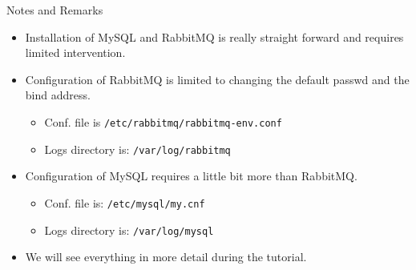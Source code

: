 \documentclass[english,serif,mathserif]{beamer}
\begin{document}
\begin{frame}{Notes and Remarks}

\begin{itemize}
\item Installation of MySQL and RabbitMQ is really straight forward
and requires limited intervention. 
\item Configuration of RabbitMQ is limited to changing the default passwd and the bind address.
      \begin{itemize}
          \item Conf. file is \texttt{/etc/rabbitmq/rabbitmq-env.conf}
          \item Logs directory is: \texttt{/var/log/rabbitmq} 
      \end{itemize} 
\item Configuration of MySQL requires a little bit more than RabbitMQ.
      \begin{itemize}
        \item Conf. file is: \texttt{/etc/mysql/my.cnf}
        \item Logs directory is: \texttt{/var/log/mysql}
      \end{itemize}
\item We will see everything in more detail during the tutorial.
\end{itemize}

\end{frame}
\end{document}

